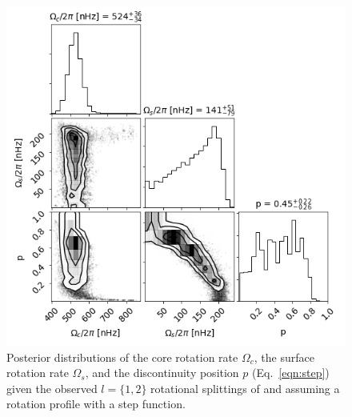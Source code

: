 \begin{figure}
\centering
    \includegraphics[width=\textwidth]{Figures/subgiant_chapter_figures/12_corner.png}
    \caption{Posterior distributions of the core rotation rate $\Omega_c$, the surface rotation rate $\Omega_s$, and the discontinuity position $p$ (Eq.~\ref{eqn:step}) given the observed $l=\{1,2\}$ rotational splittings of \thestar{} and assuming a rotation profile with a step function.}
    \label{fig:kic-corner}
\end{figure}

